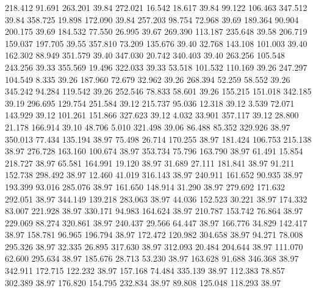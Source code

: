  218.412   91.691  263.201        39.84
 272.021   16.542   18.617        39.84
  99.122  106.463  347.512        39.84
 358.725   19.898  172.090        39.84
 257.203   98.754   72.968        39.69
 189.364   90.904  200.175        39.69
 184.532   77.550   26.995        39.67
 269.390  113.187  235.648        39.58
 206.719  159.037  197.705        39.55
 357.810   73.209  135.676        39.40
  32.768  143.108  101.003        39.40
 162.302   88.949  351.579        39.40
 347.030   20.742  340.403        39.40
 263.256  105.548  243.256        39.33
 355.569   19.496  322.033        39.33
  53.518  101.532  110.169        39.26
 247.297  104.549    8.335        39.26
 187.960   72.679   32.962        39.26
 268.394   52.259   58.552        39.26
 345.242   94.284  119.542        39.26
 252.546   78.833   58.601        39.26
 155.215  151.018  342.185        39.19
 296.695  129.754  251.584        39.12
 215.737   95.036   12.318        39.12
   3.539   72.071  143.929        39.12
 101.261  151.866  327.623        39.12
   4.032   33.901  357.117        39.12
  28.800   21.178  166.914        39.10
  48.706    5.010  321.498        39.06
  86.488   85.352  329.926        38.97
 350.013   77.434  135.194        38.97
  75.498   26.714  170.255        38.97
 181.424  106.753  215.138        38.97
 276.728  163.160  100.674        38.97
 353.734   75.796  163.790        38.97
  61.491   15.854  218.727        38.97
  65.581  164.991   19.120        38.97
  31.689   27.111  181.841        38.97
  91.211  152.738  298.492        38.97
  12.460   41.019  316.143        38.97
 240.911  161.652   90.935        38.97
 193.399   93.016  285.076        38.97
 161.650  148.914   31.290        38.97
 279.692  171.632  292.051        38.97
 344.149  139.218  283.063        38.97
  44.036  152.523   30.221        38.97
 174.332   83.007  221.928        38.97
 330.171   94.983  164.624        38.97
 210.787  153.742   76.864        38.97
 229.069   88.274  320.861        38.97
 240.437   29.566   64.447        38.97
 166.776   34.829  142.417        38.97
 158.781   96.965  196.794        38.97
 172.472  120.982  304.658        38.97
  94.271   78.008  295.326        38.97
  32.335   26.895  317.630        38.97
 312.093   20.484  204.644        38.97
 111.070   62.600  295.634        38.97
 185.676   28.713   53.230        38.97
 163.628   91.688  346.368        38.97
 342.911  172.715  122.232        38.97
 157.168   74.484  335.139        38.97
 112.383   78.857  302.389        38.97
 176.820  154.795  232.834        38.97
  89.808  125.048  118.293        38.97
